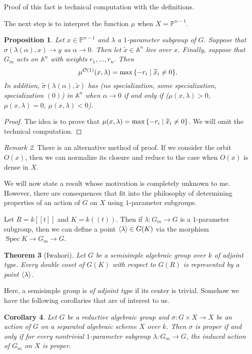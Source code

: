 \documentclass[leqno, openany]{memoir}
\newtheorem{thm}{Theorem}[section]
\newtheorem{cor}[thm]{Corollary}
\newtheorem{prop}[thm]{Proposition}
\theoremstyle{definition}
\theoremstyle{remark}
\newtheorem{rmk}[thm]{Remark}
\theoremstyle{plain}
\theoremstyle{definition}
\theoremstyle{remark}
\newcommand{\A}{\mathbb{A}}
\renewcommand{\P}{\mathbb{P}}
\newcommand{\mc}[1]{\mathcal{#1}}
\newcommand{\wt}[1]{\widetilde{#1}}
\DeclareMathOperator{\Spec}{Spec}
\begin{document}
Proof of this fact is technical computation with the definitions.

The next step is to interpret the function $\mu$ when $X = \P^{n-1}$. 
\begin{prop}
    Let $x \in \P^{n-1}$ and $\lambda$ a $1$-parameter subgroup of $G$. Suppose that $\sigma(\lambda(\alpha), x) \to y$ as $\alpha \to 0$. Then let $\wt{x} \in \A^n$ live over $x$. Finally, suppose that $G_m$ acts on $\A^n$ with weights $r_1, \ldots, r_n$. Then
    \[ \mu^{\mc{O}(1)}(x, \lambda) = \max \qty{-r_i \mid \wt{x}_i \neq 0}. \]
    In addition, $\wt{\sigma}(\lambda(\alpha),\wt{x})$ has (no specialization, some specialization, specialization $(0)$) in $\A^n$ when $\alpha \to 0$ if and only if ($\mu(x, \lambda) > 0$, $\mu(x, \lambda) = 0$, $\mu(x, \lambda) < 0$).
\end{prop}

\begin{proof}
    The idea is to prove that $\mu(x, \lambda) = \max \qty{-r_i \mid \wt{x}_i \neq 0}$. We will omit the technical computation.
\end{proof}

\begin{rmk}
    There is an alternative method of proof. If we consider the orbit $O(x)$, then we can normalize its closure and reduce to the case when $O(x)$ is dense in $X$.
\end{rmk}

We will now state a result whose motivation is completely unknown to me. However, there are consequences that fit into the philosophy of determining properties of an action of $G$ on $X$ using $1$-parameter subgroups.

Let $R = k[[t]]$ and $K = k((t))$. Then if $\lambda \colon G_m \to G$ is a $1$-parameter subgroup, then we can define a point $\ev{\lambda} \in G(K)$ via the morphism $\Spec K \to G_m \to G$.

\begin{thm}[Iwahori]
    Let $G$ be a semisimple algebraic group over $k$ of adjoint type. Every double coset of $G(K)$ with respect to $G(R)$ is represented by a point $\ev{\lambda}$.
\end{thm}

Here, a semisimple group is \textit{of adjoint type} if its center is trivial. Somehow we have the following corollaries that are of interest to us.

\begin{cor}
    Let $G$ be a reductive algebraic group and $\sigma \colon G \times X \to X$ be an action of $G$ on a separated algebraic scheme $X$ over $k$. Then $\sigma$ is proper if and only if for every nontrivial $1$-parameter subgroup $\lambda \colon G_m \to G$, the induced action of $G_m$ on $X$ is proper.
\end{cor}
\end{document}
